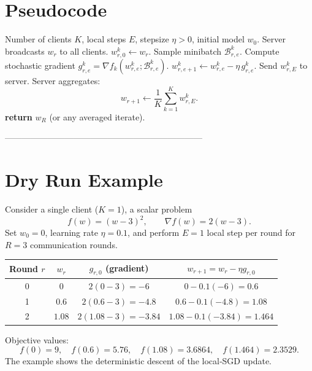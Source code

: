 \documentclass{article}
\newcommand{\grad}{\nabla}
\begin{document}
\section*{Pseudocode}
\begin{algorithm}[H]
\caption{FedLocal‑SGD}
\begin{algorithmic}[1]
\Require Number of clients $K$, local steps $E$, stepsize $\eta>0$,
          initial model $w_0$.
    \State Server broadcasts $w_r$ to all clients.
        \State $w_{r,0}^{k}\gets w_r$.
            \State Sample minibatch $\mathcal{B}_{r,e}^{k}$.
            \State Compute stochastic gradient 
                  $g_{r,e}^{k}= \grad f_k(w_{r,e}^{k};\mathcal{B}_{r,e}^{k})$.
            \State $w_{r,e+1}^{k}\gets w_{r,e}^{k}-\eta\, g_{r,e}^{k}$.
        \EndFor
        \State Send $w_{r,E}^{k}$ to server.
    \EndFor
    \State Server aggregates:
    \[
        w_{r+1}\gets \frac1K\sum_{k=1}^{K} w_{r,E}^{k}.
    \]
\EndFor
\State \textbf{return} $w_R$ (or any averaged iterate).
\end{algorithmic}
\end{algorithm}

---------------------------------------------------------------------

\section*{Dry Run Example}
Consider a single client ($K=1$), a scalar problem
\[
    f(w)=(w-3)^2, \qquad \grad f(w)=2(w-3).
\]
Set $w_0=0$, learning rate $\eta=0.1$, and perform $E=1$ local step per round
for $R=3$ communication rounds.

\begin{center}
\begin{tabular}{c|c|c|c}
Round $r$ & $w_{r}$ & $g_{r,0}$ (gradient) & $w_{r+1}=w_{r}-\eta g_{r,0}$ \\ \hline
0 & $0$ & $2(0-3)=-6$ & $0-0.1(-6)=0.6$ \\
1 & $0.6$ & $2(0.6-3)=-4.8$ & $0.6-0.1(-4.8)=1.08$ \\
2 & $1.08$ & $2(1.08-3)=-3.84$ & $1.08-0.1(-3.84)=1.464$ \\
\end{tabular}
\end{center}
Objective values:
\[
    f(0)=9,\quad f(0.6)=5.76,\quad f(1.08)=3.6864,\quad f(1.464)=2.3529.
\]
The example shows the deterministic descent of the local‑SGD update.
\end{document}
